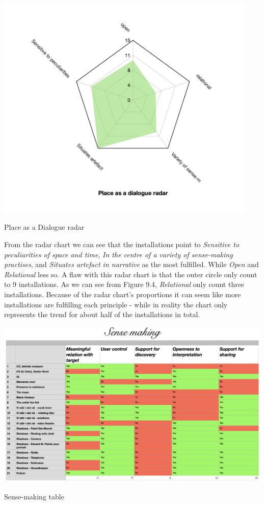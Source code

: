 \begin{table}[H]
    \includegraphics[width=12.5cm]{pictures/analysis/place_radar.png}
    \caption{Place as a Dialogue radar}
    \centering 
\end{table}


From the radar chart we can see that the installations point to \textit{Sensitive to peculiarities of space and time}, \textit{In the centre of a variety of sense-making practises}, and \textit{Situates artefact in narrative} as the most fulfilled. While \textit{Open} and \textit{Relational} less so. A flaw with this radar chart is that the outer circle only count to 9 installations. As we can see from Figure 9.4, \textit{Relational} only count three installations. Because of the radar chart's proportions it can seem like more installations are fulfilling each principle - while in reality the chart only represents the trend for about half of the installations in total. 

\begin{table}[H]
    \includegraphics[width=20cm, angle=90]{pictures/analysis/sense.png}
    \caption{Sense-making table}
    \centering 
\end{table}

